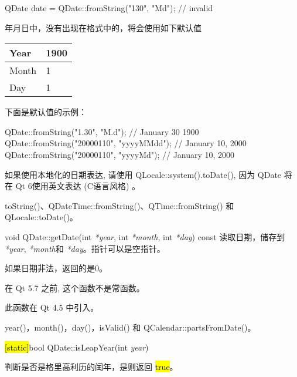 \begin{cppcode}
QDate date = QDate::fromString("130", "Md"); // invalid
\end{cppcode}

年月日中，没有出现在格式中的，将会使用如下默认值

\begin{tabular}{|l|l|}
\hline
Year&	1900\\
\hline
Month&	1\\
\hline
Day&	1\\
\hline
\end{tabular}

下面是默认值的示例：

\begin{cppcode}
QDate::fromString("1.30", "M.d");           // January 30 1900
QDate::fromString("20000110", "yyyyMMdd");  // January 10, 2000
QDate::fromString("20000110", "yyyyMd");    // January 10, 2000
\end{cppcode}



\begin{notice}
如果使用本地化的日期表达, 请使用 QLocale::system().toDate(), 因为 QDate 将在 Qt 6使用英文表达 (C语言风格) 。
\end{notice}


\begin{seeAlso}
toString()、QDateTime::fromString()、QTime::fromString() 和 QLocale::toDate()。
\end{seeAlso}


\splitLine

void QDate::getDate(int  \emph{*year}, int \emph{*month}, int \emph{*day}) const
读取日期，储存到 \emph{*year},  \emph{*month}和 \emph{*day}。指针可以是空指针。

如果日期非法，返回的是0。

\begin{notice}
 在 Qt 5.7 之前, 这个函数不是常函数。
\end{notice}

此函数在 Qt 4.5 中引入。

\begin{seeAlso}
year()，month()，day()，isValid() 和
QCalendar::partsFromDate()。
\end{seeAlso}

\splitLine

\hl{[static]}bool QDate::isLeapYear(int \emph{year})

判断是否是格里高利历的闰年，是则返回 \hl{true}。

